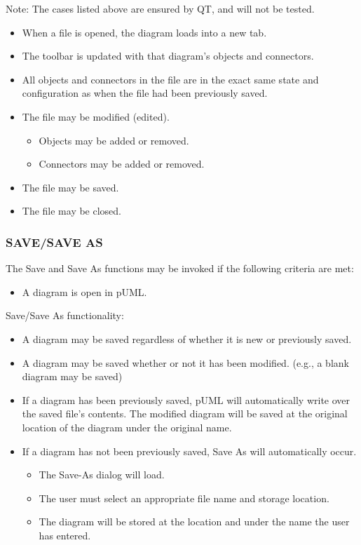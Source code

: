 \documentclass[twoside,letterpaper]{article}
\begin{document}
{\bigskip

Note: The cases listed above are ensured by QT, and will not be tested.
\newline 

\begin{itemize}
\item When a file is opened, the diagram loads into a new tab.
\item The toolbar is updated with that diagram's objects and connectors.
\item All objects and connectors in the file are in the exact same state and configuration as when the file had been previously saved.
\item The file may be modified (edited).
\begin{itemize}
\item Objects may be added or removed.
\item Connectors may be added or removed.
\end{itemize}
\item The file may be saved.
\item The file may be closed.
\end{itemize}

\bigskip

\subsubsection[SAVE]{\bfseries SAVE/SAVE AS}
{
The Save and Save As functions may be invoked if the following criteria are met: 
\begin{itemize}
\item A diagram is open in pUML.
\end{itemize}
}

\bigskip

Save/Save As functionality:
\newline
{
\begin{itemize}
\item A diagram may be saved regardless of whether it is new or previously saved.
\item A diagram may be saved whether or not it has been modified. (e.g., a blank diagram may be saved)
\item If a diagram has been previously saved, pUML will automatically write over the saved file's contents. The modified diagram will be saved at the original location of the diagram under the original name.
\item If a diagram has not been previously saved, Save As will automatically occur.
\begin{itemize}
\item The Save-As dialog will load.
\item The user must select an appropriate file name and storage location. 
\item The diagram will be stored at the location and under the name the user has entered.
\end{itemize}
\end{itemize}
}

}
\end{document}
